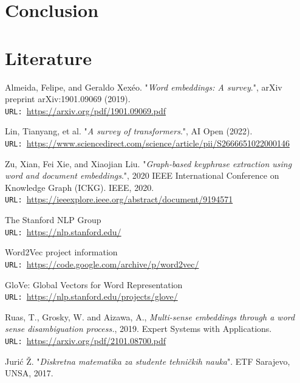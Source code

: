 \documentclass[12pt]{article}
\numberwithin{equation}{section}
\begin{document}
\begin{spacing}{1.5}
	\section{Conclusion}
	
	\newpage
	\section{Literature}
	
	\begin{thebibliography}{8}
		Almeida, Felipe, and Geraldo Xexéo. "\textit{Word embeddings: A survey}.", arXiv preprint arXiv:1901.09069 (2019). \\
		\texttt{URL: }\url{https://arxiv.org/pdf/1901.09069.pdf}
		
		Lin, Tianyang, et al. "\textit{A survey of transformers}.", AI Open (2022).\\
		\texttt{URL: }\url{https://www.sciencedirect.com/science/article/pii/S2666651022000146}
		
		Zu, Xian, Fei Xie, and Xiaojian Liu. "\textit{Graph-based keyphrase extraction using word and document embeddings}.", 2020 IEEE International Conference on Knowledge Graph (ICKG). IEEE, 2020. \\
		\texttt{URL: }\url{https://ieeexplore.ieee.org/abstract/document/9194571}
		
		The Stanford NLP Group\\
		\texttt{URL: }\url{https://nlp.stanford.edu/}
		
		Word2Vec project information\\
		\texttt{URL: }\url{https://code.google.com/archive/p/word2vec/}
		
		GloVe: Global Vectors for Word Representation\\
		\texttt{URL: }\url{https://nlp.stanford.edu/projects/glove/}
		
		Ruas, T., Grosky, W. and Aizawa, A.,  \textit{Multi-sense embeddings through a word sense disambiguation process.}, 2019. Expert Systems with Applications. \\
		\texttt{URL: }\url{https://arxiv.org/pdf/2101.08700.pdf}
		
		Jurić Ž. "\textit{Diskretna matematika za studente tehničkih nauka}". ETF Sarajevo, UNSA, 2017. 
		
	\end{thebibliography}

	\end{spacing}
	
\end{document}
